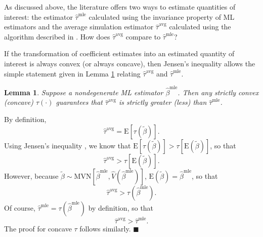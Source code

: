 \documentclass[11pt]{article}
\newtheorem{lemma}{Lemma}
\newenvironment{proof}[1][Proof]{\begin{trivlist}
\item[\hskip \labelsep {\bfseries #1}]}{\end{trivlist}}
\begin{document}
As discussed above, the literature offers two ways to estimate quantities of interest: the estimator $\hat{\tau}^\text{mle}$ calculated using the invariance property of ML estimators and the average simulation estimator $\hat{\tau}^\text{avg}$ calculated using the algorithm described in \cite{KingTomzWittenberg2000}. How does $\hat{\tau}^\text{avg}$ compare to $\hat{\tau}^{\text{mle}}$? 


If the transformation of coefficient estimates into an estimated quantity of interest is always convex (or always concave), then Jensen's inequality allows the simple statement given in Lemma \ref{lem:direction} relating $\hat{\tau}^\text{avg}$ and $\hat{\tau}^{\text{mle}}$.

\begin{lemma}\label{lem:direction}
Suppose a nondegenerate ML estimator $\hat{\beta}^\text{mle}$.
Then any strictly convex (concave) $\tau(\cdot)$ guarantees that $\hat{\tau}^{\text{avg}}$ is strictly greater (less) than $\hat{\tau}^\text{mle}$.
\end{lemma}
\begin{proof}
By definition, $$ \hat{\tau}^{\text{avg}} = \text{E}\left[ \tau \left(\tilde{\beta} \right) \right].$$
Using Jensen's inequality \citep[p.\@ 190, Thm.\@ 4.7.7]{CasellaBerger2002}, we know that $\text{E}\left[ \tau \left(\tilde{\beta} \right) \right] > \tau \left[ \text{E}\left( \tilde{\beta} \right) \right]$, so that $$\hat{\tau}^{\text{avg}} > \tau \left[ \text{E}\left( \tilde{\beta} \right) \right].$$
However, because $\tilde{\beta} \sim \text{MVN} \left[ \hat{\beta}^{\text{mle}}, \hat{V} \left( \hat{\beta}^{\text{mle}} \right) \right]$, $\text{E}\left( \tilde{\beta} \right) = \hat{\beta}^\text{mle}$, so that
$$\hat{\tau}^{\text{avg}} > \tau \left( \hat{\beta}^\text{mle}\right).$$
Of course, $\hat{\tau}^\text{mle} = \tau \left( {\hat{\beta}^\text{mle}} \right)$ by definition, so that $$\hat{\tau}^{\text{avg}} > \hat{\tau}^\text{mle}.$$
The proof for concave $\tau$ follows similarly.
 $\blacksquare$
\end{proof}
\end{document}
